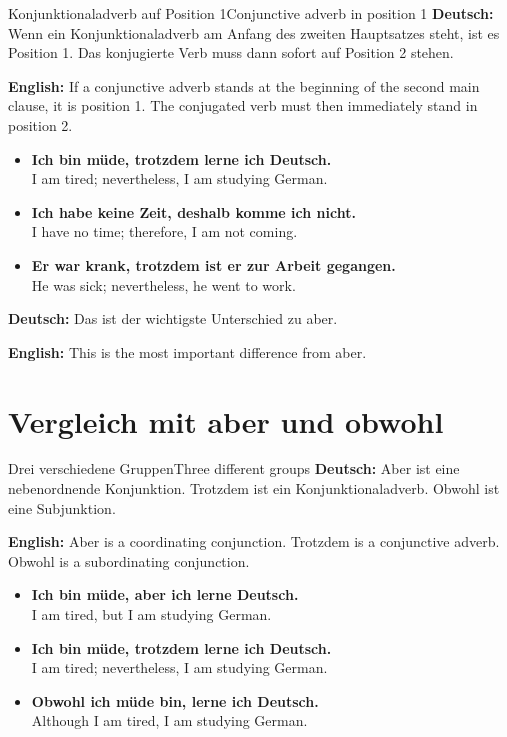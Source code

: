 \documentclass[a4paper,11pt]{article}
\newcommand{\GermanText}[1]{\textbf{Deutsch: }#1\par}
\newcommand{\EnglishText}[1]{{\small\color{SoftGray}\textbf{English: }#1\par}}
\newcommand{\ExampleItem}[2]{\item \textbf{#1}\\{\small\color{SoftGray}#2}}
\begin{document}
        \begin{grammarentry}{Konjunktionaladverb auf Position 1}{Conjunctive adverb in position 1}
            \GermanText{Wenn ein Konjunktionaladverb am Anfang des zweiten Hauptsatzes steht, ist es Position 1. Das konjugierte Verb muss dann sofort auf Position 2 stehen.}
            \EnglishText{If a conjunctive adverb stands at the beginning of the second main clause, it is position 1. The conjugated verb must then immediately stand in position 2.}
            
            \begin{exbox}
                \begin{itemize}
                    \ExampleItem{Ich bin müde, trotzdem lerne ich Deutsch.}{I am tired; nevertheless, I am studying German.}
                    \ExampleItem{Ich habe keine Zeit, deshalb komme ich nicht.}{I have no time; therefore, I am not coming.}
                    \ExampleItem{Er war krank, trotzdem ist er zur Arbeit gegangen.}{He was sick; nevertheless, he went to work.}
                \end{itemize}
            \end{exbox}
            
            \GermanText{Das ist der wichtigste Unterschied zu aber.}
            \EnglishText{This is the most important difference from aber.}
        \end{grammarentry}
    
    
    \section{Vergleich mit aber und obwohl}
        
        \begin{grammarentry}{Drei verschiedene Gruppen}{Three different groups}
            \GermanText{Aber ist eine nebenordnende Konjunktion. Trotzdem ist ein Konjunktionaladverb. Obwohl ist eine Subjunktion.}
            \EnglishText{Aber is a coordinating conjunction. Trotzdem is a conjunctive adverb. Obwohl is a subordinating conjunction.}
            
            \begin{exbox}
                \begin{itemize}
                    \ExampleItem{Ich bin müde, aber ich lerne Deutsch.}{I am tired, but I am studying German.}
                    \ExampleItem{Ich bin müde, trotzdem lerne ich Deutsch.}{I am tired; nevertheless, I am studying German.}
                    \ExampleItem{Obwohl ich müde bin, lerne ich Deutsch.}{Although I am tired, I am studying German.}
                \end{itemize}
            \end{exbox}
        \end{grammarentry}
    
\end{document}
